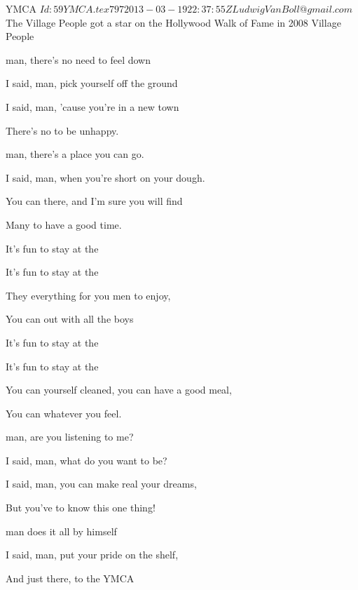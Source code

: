 \begin{SBSong}{YMCA}
  {$Id: 59YMCA.tex 797 2013-03-19 22:37:55Z LudwigVanBoll@gmail.com $}
  {The Village People got a star on the Hollywood Walk of Fame in 2008}
  {Village People}
  \begin{SBVerse}
	 man, there's no need to feel down 
	
	I said,  man, pick yourself off the ground 
	
	I said,  man, 'cause you're in a new town 
	
	There's no  to be unhappy.

	 man, there's a place you can go.
 
	I said,  man, when you're short on your dough. 
	
	You can  there, and I'm sure you will find 
	
	Many  to have a good time.
  \end{SBVerse}
  \begin{SBChorus}
	It's fun to stay at the  
	
	It's fun to stay at the  
	
	They  everything for you men to enjoy, 
	
	You can  out with all the boys

	It's fun to stay at the  
	
	It's fun to stay at the 
	
	You can  yourself cleaned, you can have a good meal, 
	
	You can  whatever you feel.
  \end{SBChorus}
  \begin{SBVerse}
	 man, are you listening to me? 
	
	I said,  man, what do you want to be? 
	
	I said,  man, you can make real your dreams, 
	
	But you've  to know this one thing!

	 man does it all by himself 
	
	I said,  man, put your pride on the shelf, 
	
	And just  there, to the YMCA 
	

\end{SBVerse}
\end{SBSong}
